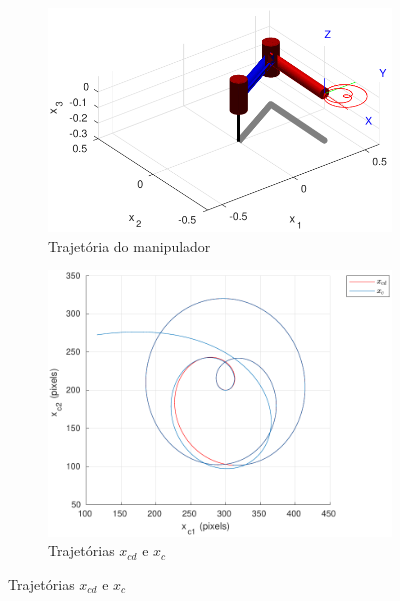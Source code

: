 \documentclass[a4paper,11pt]{article}
\theoremstyle{mytheor}
\begin{document}
\begin{figure}[ht]
\centering
  \begin{minipage}{\linewidth}
  \centering
    \begin{subfigure}[b]{0.55\textwidth}
    \includegraphics[width=1\textwidth]{figs/ex3_2_traj.pdf}
    \caption{Trajetória do manipulador}
    \label{fig:ex3_2_traj}
    \end{subfigure}
  \end{minipage}
  \begin{minipage}{\linewidth}
  \centering
    \begin{subfigure}[b]{0.49\textwidth}
    \includegraphics[width=1\textwidth]{figs/ex3_2_x_c.pdf}
    \caption{Trajetórias $x_{cd}$ e $x_c$}
    \label{fig:ex3_2_x_c}
    \end{subfigure}

\end{minipage}
\end{figure}
\end{document}
